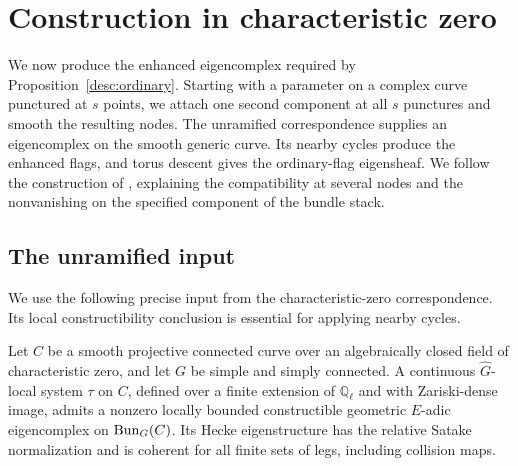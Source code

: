 \section{Construction in characteristic zero}\label{con:section}

We now produce the enhanced eigencomplex required by
Proposition~\ref{desc:ordinary}.  Starting with a parameter on a complex
curve punctured at $s$ points, we attach one second component at all
$s$ punctures and smooth the resulting nodes.  The unramified
correspondence supplies an eigencomplex on the smooth generic curve.
Its nearby cycles produce the enhanced flags, and torus descent gives
the ordinary-flag eigensheaf.  We follow the construction of
\cite[Section~8]{CT}, explaining the compatibility at several nodes and
the nonvanishing on the specified component of the bundle stack.

\subsection{The unramified input}

We use the following precise input from the characteristic-zero
correspondence.  Its local constructibility conclusion is essential
for applying nearby cycles.

\begin{lemma}[{\cite[Lemma~8.1]{CT}}]\label{con:unramified}
Let $C$ be a smooth projective connected curve over an algebraically
closed field of characteristic zero, and let $G$ be simple and simply
connected.  A continuous $\widehat G$-local system $\tau$ on $C$,
defined over a finite extension of $\mathbb Q_\ell$ and with
Zariski-dense image, admits a nonzero locally bounded constructible
geometric $E$-adic eigencomplex on $\operatorname{Bun}_G(C)$.  Its Hecke
eigenstructure has the relative Satake normalization and is coherent
for all finite sets of legs, including collision maps.
\end{lemma}

